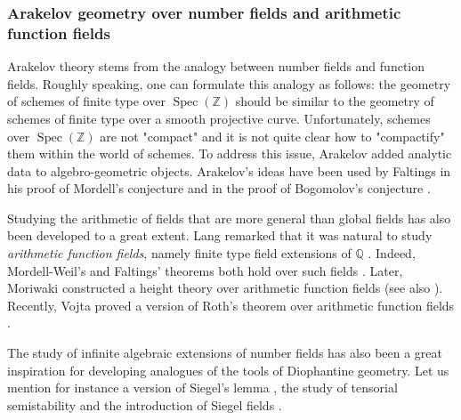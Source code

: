 \documentclass [11pt,reqno]{amsart}
\def\bQ{{\mathbb{Q}}}
\def\bZ{{\mathbb{Z}}}
\newcommand{\1}{\mathmybb{1}}
\def\Spec{\operatorname{Spec}}
\begin{document}
\subsubsection*{Arakelov geometry over number fields and arithmetic function fields}

Arakelov theory stems from the analogy between number fields and function fields. Roughly speaking, one can formulate this analogy as follows: the geometry of schemes of finite type over $\Spec(\bZ)$ should be similar to the geometry of schemes of finite type over a smooth projective curve. Unfortunately, schemes over $\Spec(\bZ)$ are not "compact" and it is not quite clear how to "compactify" them within the world of schemes. To address this issue, Arakelov \cite{Arakelov74} added analytic data to algebro-geometric objects. Arakelov's ideas have been used by Faltings \cite{Faltings91} in his proof of Mordell's conjecture and in the proof of Bogomolov's conjecture \cite{Ullmo98,Zhang98}.



Studying the arithmetic of fields that are more general than global fields has also been developed to a great extent. Lang remarked that it was natural to study \emph{arithmetic function fields}, namely finite type field extensions of $\bQ$ \cite{Lang74,Lang86}. Indeed, Mordell-Weil's and Faltings' theorems both hold over such fields \cite{Lang91}. Later, Moriwaki constructed a height theory over arithmetic function fields \cite{Moriwakiheights} (see also \cite{BPS16}). Recently, Vojta proved a version of Roth's theorem over arithmetic function fields \cite{Vojta21}.

The study of infinite algebraic extensions of number fields has also been a great inspiration for developing analogues of the tools of Diophantine geometry. Let us mention for instance a version of Siegel's lemma \cite{RoyTHunder96}, the study of tensorial semistability \cite{BostChen13} and the introduction of Siegel fields \cite{GaudronRemond17}.
\end{document}
